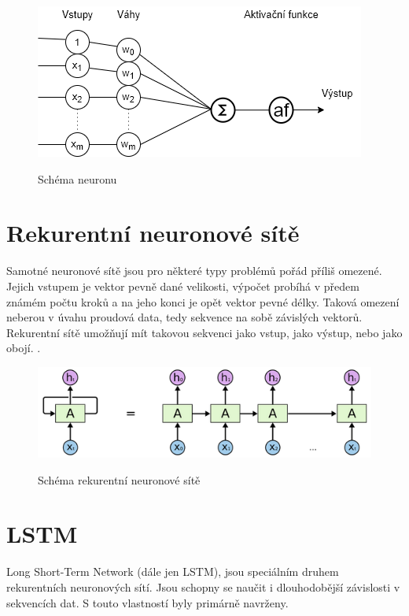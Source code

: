 \begin{figure}[h]\centering
    \centering
    \includegraphics[width=0.6\linewidth]{obrazky/neuronSchema.png}\\[1pt]  
    \caption{Schéma neuronu}    
    \label{obrazekSchemaNeuronu}
\end{figure}


\section{Rekurentní neuronové sítě}
Samotné neuronové sítě jsou pro některé typy problémů pořád příliš omezené.
Jejich vstupem je vektor pevně dané velikosti, 
výpočet probíhá v předem známém počtu kroků 
a na jeho konci je opět vektor pevné délky.
Taková omezení neberou v úvahu proudová data, 
tedy sekvence na sobě závislých vektorů.
Rekurentní sítě umožňují mít takovou sekvenci jako vstup, 
jako výstup, nebo jako obojí.
\cite{Karpathy_RNNs}.

\begin{figure}[h]\centering
    \centering
    \includegraphics[width=0.6\linewidth]{obrazky/RNNSchema.png}\\[1pt]  
    \caption{Schéma rekurentní neuronové sítě\cite{colah_lstm}}    
    \label{obrazekSchemaRekurentniNeuronoveSite}
\end{figure}

\section{LSTM}
\label{lstmTeorie}
Long Short-Term Network (dále jen LSTM), 
jsou speciálním druhem rekurentních neuronových sítí.
Jsou schopny se naučit i dlouhodobější závislosti v sekvencích dat.
S touto vlastností byly primárně navrženy.\cite{colah_lstm}
\par

